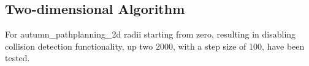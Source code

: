 \subsection{Two-dimensional Algorithm}

For autumn\_pathplanning\_2d radii starting from zero, resulting in disabling collision detection functionality, up two 2000, with a step size of 100, have been tested. 

